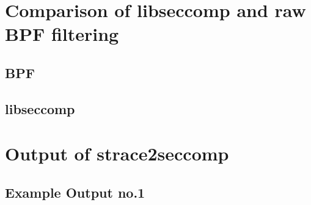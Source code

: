 \chapter{Comparison of libseccomp and raw BPF filtering}

\section{BPF}


\section{libseccomp}


\chapter{Output of strace2seccomp}

\section{Example Output no.1}

